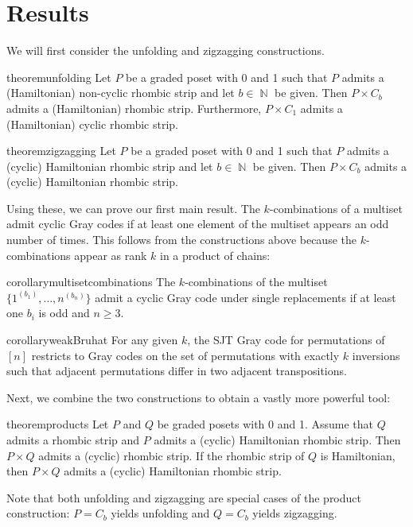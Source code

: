 \documentclass[fontsize=11pt,a4paper,DIV=12]{scrartcl}
\DeclareMathOperator{\N}{\mathbb{N}}
\begin{document}
\section{Results}\label{sec:results}

We will first consider the unfolding and zigzagging constructions.

\begin{restatable}[Unfolding]{theorem}{unfolding}\label{thm:unfolding}
    Let $P$ be a graded poset with 0 and 1 such that $P$ admits a (Hamiltonian) non-cyclic rhombic strip and let $b\in\N$ be given. Then $P\times C_b$ admits a (Hamiltonian) rhombic strip. Furthermore, $P\times C_{1}$ admits a (Hamiltonian) cyclic rhombic strip.
\end{restatable}

\begin{restatable}[Zigzagging]{theorem}{zigzagging}\label{thm:zigzagging}
    Let $P$ be a graded poset with 0 and 1 such that $P$ admits a (cyclic) Hamiltonian rhombic strip and let $b\in\N$ be given. Then $P\times C_b$ admits a (cyclic) Hamiltonian rhombic strip.
\end{restatable}

Using these, we can prove our first main result. The $k$-combinations of a multiset admit cyclic Gray codes if at least one element of the multiset appears an odd number of times. This follows from the constructions above because the $k$-combinations appear as rank $k$ in a product of chains:

\begin{restatable}{corollary}{multisetcombinations}\label{thm:multiset combinations}
    The $k$-combinations of the multiset $\{1^{(b_1)},\ldots,n^{(b_n)}\}$ admit a cyclic Gray code under single replacements if at least one $b_i$ is odd and $n\ge 3$.
\end{restatable}

\begin{restatable}{corollary}{weakBruhat}\label{thm:bruhat}
    For any given $k$, the SJT Gray code for permutations of $[n]$ restricts to Gray codes on the set of permutations with exactly $k$ inversions such that adjacent permutations differ in two adjacent transpositions.
\end{restatable}

Next, we combine the two constructions to obtain a vastly more powerful tool:

\begin{restatable}{theorem}{products}\label{thm:products}
    Let $P$ and $Q$ be graded posets with 0 and 1. Assume that $Q$ admits a rhombic strip and $P$ admits a (cyclic) Hamiltonian rhombic strip. Then $P\times Q$ admits a (cyclic) rhombic strip. If the rhombic strip of $Q$ is Hamiltonian, then $P\times Q$ admits a (cyclic) Hamiltonian rhombic strip.
\end{restatable}
Note that both unfolding and zigzagging are special cases of the product construction: $P=C_b$ yields unfolding and $Q=C_b$ yields zigzagging.
\end{document}
